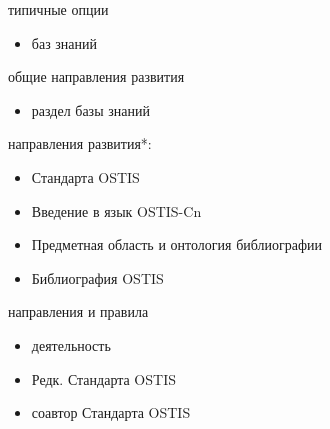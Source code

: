 \begin{SCn}
\begin{scnitemize}
\begin{itemize}
	\end{itemize}	
\end{scnitemize}
\begin{scnitemize}
	\item типичные опции
	\begin{itemize}
		\item баз знаний	
	\end{itemize}	
\end{scnitemize}
\begin{scnitemize}
	\item общие направления развития
	\begin{itemize}
		\item раздел базы знаний	
	\end{itemize}	
\end{scnitemize}
\begin{scnitemize}
	\item направления развития*:
	\begin{itemize}
		\item Стандарта OSTIS
		\item Введение в язык OSTIS-Cn	
		\item Предметная область и онтология библиографии
		\item Библиография OSTIS
	\end{itemize}	
\end{scnitemize}
\begin{scnitemize}
	\item направления и правила	
	\begin{itemize}
		\item деятельность	
		\item Редк. Стандарта OSTIS
		\item соавтор Стандарта OSTIS
	\end{itemize}
\end{scnitemize}

	
\end{SCn}